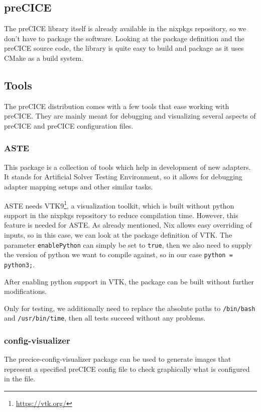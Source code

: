 \documentclass[conference,final,a4paper]{IEEEtran}
\begin{document}
\subsection{preCICE}

The preCICE library itself is already available in the nixpkgs repository, so we don't have to package the software.
Looking at the package definition and the preCICE source code, the library is quite easy to build and package as it uses CMake as a build system.

\subsection{Tools}

The preCICE distribution comes with a few tools that ease working with preCICE.
They are mainly meant for debugging and visualizing several aspects of preCICE and preCICE configuration files.

\subsubsection{ASTE}

This package is a collection of tools which help in development of new adapters.
It stands for Artificial Solver Testing Environment, so it allows for debugging adapter mapping setups and other similar tasks.

ASTE needs VTK9\footnote{\url{https://vtk.org/}}, a visualization toolkit, which is built without python support in the nixpkgs repository to reduce compilation time.
However, this feature is needed for ASTE.
As already mentioned, Nix allows easy overriding of inputs, so in this case, we can look at the package definition of VTK.
The parameter \texttt{enablePython} can simply be set to \texttt{true}, then we also need to supply the version of python we want to compile against, so in our case \texttt{python = python3;}.

After enabling python support in VTK, the package can be built without further modifications.

Only for testing, we additionally need to replace the absolute paths to \texttt{/bin/bash} and \texttt{/usr/bin/time}, then all tests succeed without any problems.

\subsubsection{config-visualizer}

The precice-config-visualizer package can be used to generate images that represent a specified preCICE config file to check graphically what is configured in the file.
\end{document}
